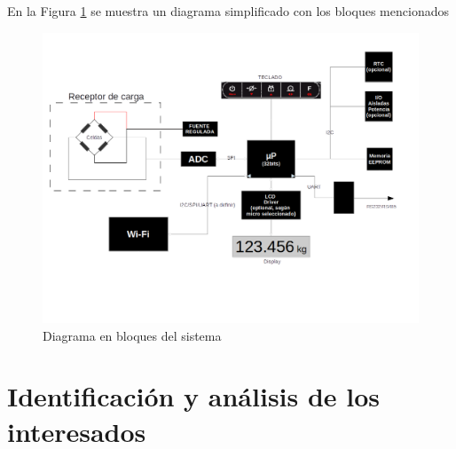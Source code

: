 \documentclass[11pt]{charter}
\begin{document}
En la Figura \ref{fig:diagBloques} se muestra un diagrama simplificado con los bloques mencionados

\vspace{25px}

\begin{figure}[htpb]
\centering 
\includegraphics[width=.7\textwidth]{./Figuras/esquema.png}
\caption{Diagrama en bloques del sistema}
\label{fig:diagBloques}
\end{figure}

\vspace{25px}
\newpage
\section{Identificación y análisis de los interesados}
\label{sec:interesados}
\end{document}
